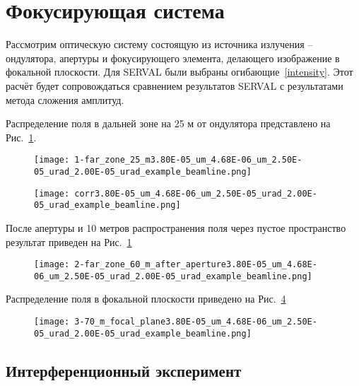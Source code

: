 \section{Фокусирующая система}
Рассмотрим оптическую систему состоящую из источника излучения -- ондулятора, апертуры и фокусирующего элемента, делающего изображение в фокальной плоскости. Для SERVAL были выбраны огибающие~\ref{intensity}. Этот расчёт будет сопровождаться сравнением результатов SERVAL с результатами метода сложения амплитуд.

Распределение поля в дальней зоне на 25 м от ондулятора представлено на Рис.~\ref{fig:focusing_system_far_zone}.
\begin{figure}[H] 
	\centering 	\texttt{[image: 1-far\_zone\_25\_m3.80E-05\_um\_4.68E-06\_um\_2.50E-05\_urad\_2.00E-05\_urad\_example\_beamline.png]}
	\caption{}
	\label{fig:focusing_system_far_zone}
\end{figure}

\begin{figure}[H] 
	\centering 	\texttt{[image: corr3.80E-05\_um\_4.68E-06\_um\_2.50E-05\_urad\_2.00E-05\_urad\_example\_beamline.png]}
	\caption{}
	\label{fig:focusing_system_corr}
\end{figure}
\noindent После апертуры и 10 метров распространения поля через пустое пространство результат приведен на Рис.~\ref{fig:focusing_system_far_zone}
\begin{figure}[H] 
	\centering 	\texttt{[image: 2-far\_zone\_60\_m\_after\_aperture3.80E-05\_um\_4.68E-06\_um\_2.50E-05\_urad\_2.00E-05\_urad\_example\_beamline.png]}
	\caption{}
	\label{fig:focusing_system_after_aperture}
\end{figure}
\noindent Распределение поля в фокальной плоскости приведено на Рис.~\ref{fig:focusing_system_in_focus}
\begin{figure}[H] 
	\centering 	\texttt{[image: 3-70\_m\_focal\_plane3.80E-05\_um\_4.68E-06\_um\_2.50E-05\_urad\_2.00E-05\_urad\_example\_beamline.png]}
	\caption{}
	\label{fig:focusing_system_in_focus}
\end{figure}

\subsection{Интерференционный эксперимент}

